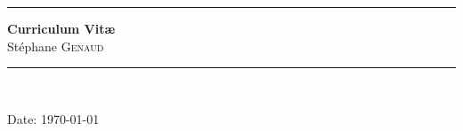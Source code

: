 \documentclass[11pt]{article}
\begin{document}
\setlength{\parindent}{0mm}



\rule{\linewidth}{1mm}
\begin{center}
\Large{\textbf{Curriculum Vit{\ae}}}\\[5mm]
\Large{Stéphane \textsc{Genaud}}\\[1cm]

\rule{\linewidth}{1mm}
\\
\vspace{3cm}
\end{center}
\begin{center}
Date: \today\\
\end{center}

\newpage
\mbox{}%

\setlength{\parindent}{5mm} %






\end{document}
